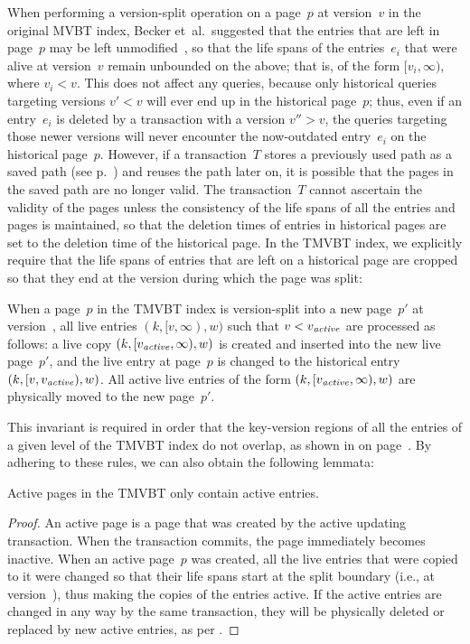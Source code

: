 When performing a version-split operation on a page~$p$ at version~$v$ in the
original MVBT index, Becker et~al.\ suggested that the
entries that are left in page~$p$ may be left
unmodified~\cite{becker:1996:mvbt}, so that the life spans of the
entries~$e_i$ that were alive at version~$v$ remain unbounded on the above;
that is, of the form $[v_i, \infty)$, where $v_i < v$.
This does not affect any queries, because only historical queries targeting
versions $v' < v$ will ever end up in the historical page~$p$; thus, even if
an entry~$e_i$ is deleted by a transaction with a version $v'' > v$, the
queries targeting those newer versions will never encounter the now-outdated
entry~$e_i$ on the historical page~$p$. 
However, if a transaction~$T$ stores a previously used path as a saved path
(see p.~\pageref{def:saved-path}) and reuses the path later on, it is
possible that the pages in the saved path are no longer valid.
The transaction~$T$ cannot ascertain the validity of the pages unless the
consistency of the life spans of all the entries and pages is maintained, so 
that the deletion times of entries in historical pages are set to the
deletion time of the historical page. 
In the TMVBT index, we explicitly require that the life spans of entries that
are left on a historical page are cropped so that they end at the version
during which the page was split:

\thmskip
\begin{invariant}
\label{inv:tmvbt-live-entry-copy}
When a page~$p$ in the TMVBT index is version-split into a new page~$p'$ at
version~\actver, all live entries $(k, [v, \infty), w)$ such that $v <
\smash{v_{\text{\textit{active}}}}$ are processed as follows: 
a live copy $(k, [\smash{v_{\text{\textit{active}}}}, \infty), w)$ is created and inserted into the new
live page~$p'$, and the live entry at page~$p$ is changed to the historical
entry $(k, [v, \smash{v_{\text{\textit{active}}}}), w)$.
All active live entries of the form $(k, [\smash{v_{\text{\textit{active}}}}, \infty), w)$ are physically
moved to the new page~$p'$.
\end{invariant}
\thmskip

This invariant is required in order that the key-version regions of all
the entries of a given level of the TMVBT index do not overlap, as shown in
 on page~\pageref{fig:mvbt-space-partition}.
By adhering to these rules, we can also obtain the following lemmata: 

\thmskip
\begin{lemma}
\label{lemma:active-pages-active-entries}
Active pages in the TMVBT only contain active entries.
\end{lemma}
\begin{proof}
An active page is a page that was created by the active updating transaction.
When the transaction commits, the page immediately becomes inactive.
When an active page~$p$ was created, all the live entries that were copied to
it were changed so that their life spans start at the split boundary
(i.e., at version~\actver), thus making the copies of the entries active.
If the active entries are changed in any way by the same transaction, they
will be physically deleted or replaced by new active entries, as per
.
\end{proof}
\thmskip

